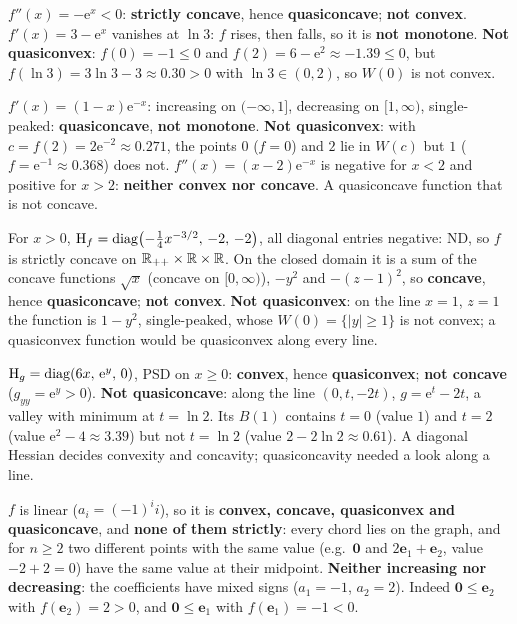 \begin{solutions}
  \item $f''(x)=-\mathrm{e}^{x}<0$: \textbf{strictly concave}, hence
        \textbf{quasiconcave}; \textbf{not convex}. $f'(x)=3-\mathrm{e}^{x}$
        vanishes at $\ln3$: $f$ rises, then falls, so it is \textbf{not
        monotone}. \textbf{Not quasiconvex}: $f(0)=-1\le0$ and
        $f(2)=6-\mathrm{e}^{2}\approx-1.39\le0$, but
        $f(\ln3)=3\ln3-3\approx0.30>0$ with $\ln3\in(0,2)$, so $W(0)$ is
        not convex.

  \item $f'(x)=(1-x)\mathrm{e}^{-x}$: increasing on $(-\infty,1]$,
        decreasing on $[1,\infty)$, single-peaked: \textbf{quasiconcave},
        \textbf{not monotone}. \textbf{Not quasiconvex}: with
        $c=f(2)=2\mathrm{e}^{-2}\approx0.271$, the points $0$ ($f=0$) and
        $2$ lie in $W(c)$ but $1$ ($f=\mathrm{e}^{-1}\approx0.368$) does
        not. $f''(x)=(x-2)\mathrm{e}^{-x}$ is negative for $x<2$ and
        positive for $x>2$: \textbf{neither convex nor concave}. A
        quasiconcave function that is not concave.

  \item For $x>0$,
        $\operatorname{H}_f=\operatorname{diag}\bigl(-\tfrac14x^{-3/2},\,-2,\,-2\bigr)$,
        all diagonal entries negative: ND, so $f$ is strictly concave on
        $\mathbb{R}_{++}\times\mathbb{R}\times\mathbb{R}$. On the closed domain it is a sum of the
        concave functions $\sqrt{x}$ (concave on $[0,\infty)$), $-y^{2}$
        and $-(z-1)^{2}$, so \textbf{concave}, hence \textbf{quasiconcave};
        \textbf{not convex}. \textbf{Not quasiconvex}: on the line
        $x=1$, $z=1$ the function is $1-y^{2}$, single-peaked, whose
        $W(0)=\{|y|\ge1\}$ is not convex; a quasiconvex function would be
        quasiconvex along every line.

  \item $\operatorname{H}_g=\operatorname{diag}(6x,\,\mathrm{e}^{y},\,0)$, PSD on
        $x\ge0$: \textbf{convex}, hence \textbf{quasiconvex}; \textbf{not
        concave} ($g_{yy}=\mathrm{e}^{y}>0$). \textbf{Not quasiconcave}:
        along the line $(0,t,-2t)$, $g=\mathrm{e}^{t}-2t$, a valley with
        minimum at $t=\ln2$. Its $B(1)$ contains $t=0$ (value $1$) and
        $t=2$ (value $\mathrm{e}^{2}-4\approx3.39$) but not $t=\ln2$ (value
        $2-2\ln2\approx0.61$). A diagonal Hessian decides convexity and
        concavity; quasiconcavity needed a look along a line.

  \item $f$ is linear ($a_i=(-1)^{i}i$), so it is \textbf{convex,
        concave, quasiconvex and quasiconcave}, and \textbf{none of them
        strictly}: every chord lies on the graph, and for $n\ge2$ two
        different points with the same value (e.g.\ $\mathbf{0}$ and
        $2\mathbf{e}_1+\mathbf{e}_2$, value $-2+2=0$) have the same value
        at their midpoint. \textbf{Neither increasing nor decreasing}: the
        coefficients have mixed signs ($a_1=-1$, $a_2=2$). Indeed
        $\mathbf{0}\le\mathbf{e}_2$ with $f(\mathbf{e}_2)=2>0$, and
        $\mathbf{0}\le\mathbf{e}_1$ with $f(\mathbf{e}_1)=-1<0$.


\end{solutions}
